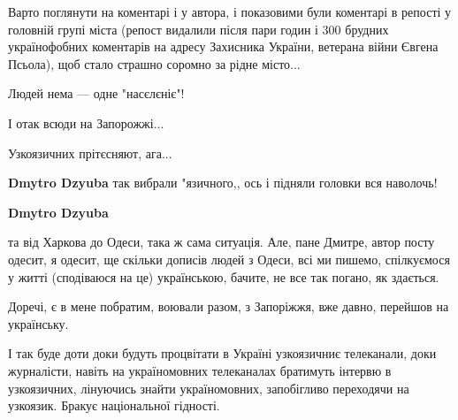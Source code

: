 \begin{itemize}
\begin{itemize}
Варто поглянути на коментарі і у автора, і показовими були коментарі в репості
у головній групі міста (репост видалили після пари годин і 300 брудних
українофобних коментарів на адресу Захисника України, ветерана війни Євгена
Псьола), щоб стало страшно соромно за рідне місто...

Людей нема — одне "насєлєніє"!

І отак всюди на Запорожжі...

Узкоязичних прітєсняют, ага...

 
\textbf{Dmytro Dzyuba} так вибрали "язичного,, ось і підняли головки вся наволочь!

 
\textbf{Dmytro Dzyuba} 

та від Харкова до Одеси, така ж сама ситуація. Але, пане Дмитре, автор посту
одесит, я одесит, ще скільки дописів людей з Одеси, всі ми пишемо, спілкуємося
у житті (сподіваюся на це) українською, бачите, не все так погано, як здається.

Доречі, є в мене побратим, воювали разом, з Запоріжжя, вже давно, перейшов на
українську.


 

І так буде доти доки будуть процвітати в Україні узкоязичниє телеканали, доки
журналісти, навіть на україномовних телеканалах братимуть інтервю в
узкоязичних, лінуючись знайти україномовних, запобігливо переходячи на
узкоязик. Бракує національної гідності.

 


\end{itemize}
\end{itemize}
